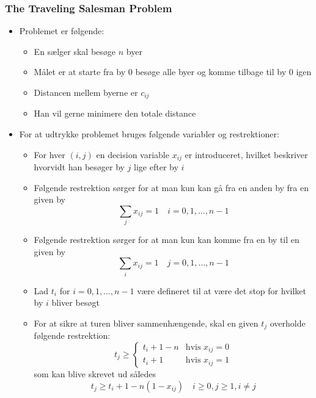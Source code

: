 \subsubsection{The Traveling Salesman Problem}
\begin{itemize}
	\item Problemet er følgende:
  \begin{itemize}
  	\item En sælger skal besøge $n$ byer 
    \item Målet er at starte fra by $0$ besøge alle byer og komme tilbage til by $0$ igen
    \item Distancen mellem byerne er $c_{ij}$
    \item Han vil gerne minimere den totale distance
  \end{itemize}
  \item For at udtrykke problemet bruges følgende variabler og restrektioner:
  \begin{itemize}
  	\item For hver $(i,j)$ en decision variable $x_{ij}$ er introduceret, hvilket beskriver hvorvidt han besøger by $j$ lige efter by $i$
    \item Følgende restrektion sørger for at man kun kan gå fra en anden by fra en given by
    \begin{equation*}
      \sum_{j} x_{ij} = 1 \quad i=0,1,\dots,n-1
    \end{equation*}
    \item Følgende restrektion sørger for at man kun kan komme fra en by til en given by
    \begin{equation*}
      \sum_{i} x_{ij} = 1 \quad j=0,1,\dots,n-1
    \end{equation*}
    \item Lad $t_i$ for $i=0,1,\dots, n-1$ være defineret til at være det stop for hvilket by $i$ bliver besøgt
    \item For at sikre at turen bliver sammenhængende, skal en given $t_j$ overholde følgende restrektion:
    \begin{equation*}
      t_j \geq 
      \begin{cases}
        \mbox{$t_i+1-n$} & \mbox{hvis $x_{ij}= 0$} \\
        \mbox{$t_i+1$} & \mbox{hvis $x_{ij}= 1$} 
      \end{cases}
    \end{equation*}
    som kan blive skrevet ud således
    \begin{equation*}
      t_j \geq t_i +1 - n(1-x_{ij}) \quad i \geq 0, j \geq 1, i \neq j

\end{equation*}
\end{itemize}
\end{itemize}
